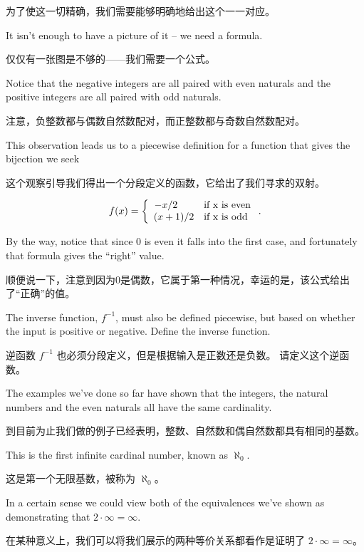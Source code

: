 为了使这一切精确，我们需要能够明确地给出这个一一对应。

It isn't enough to have a picture
of it -- we need a
formula.

仅仅有一张图是不够的——我们需要一个公式。

Notice that the negative integers are all paired with even naturals
and the positive integers are all paired with odd naturals.

注意，负整数都与偶数自然数配对，而正整数都与奇数自然数配对。

This observation
leads us to a piecewise definition for a function that gives the bijection we
seek

这个观察引导我们得出一个分段定义的函数，它给出了我们寻求的双射。

\[ f(x) = \left\{ \begin{array}{cl} -x/2 \rule{16pt}{0pt} & \mbox{if x is even} \\
             (x + 1)/2                  & \mbox{if x is odd}\end{array} \right.
    .\]

By the way, notice that since 0 is even it falls into the first case, and
fortunately that formula gives the ``right'' value.

顺便说一下，注意到因为0是偶数，它属于第一种情况，幸运的是，该公式给出了“正确”的值。

\begin{exer}
    The inverse function, $f^{-1}$, must also be defined piecewise, but
    based on whether the input is positive or negative.
    Define the inverse function.
\end{exer}

\begin{exer}
    逆函数 $f^{-1}$ 也必须分段定义，但是根据输入是正数还是负数。
    请定义这个逆函数。
\end{exer}

The examples we've done so far have shown that the integers,
the natural numbers and the even naturals all have the same
cardinality.

到目前为止我们做的例子已经表明，整数、自然数和偶自然数都具有相同的基数。

This is the first infinite cardinal number, known
as $\aleph_0$.

这是第一个无限基数，被称为 $\aleph_0$。

In a certain sense we could view both
of the equivalences we've shown as demonstrating that
$2 \cdot \infty = \infty$.

在某种意义上，我们可以将我们展示的两种等价关系都看作是证明了 $2 \cdot \infty = \infty$。

